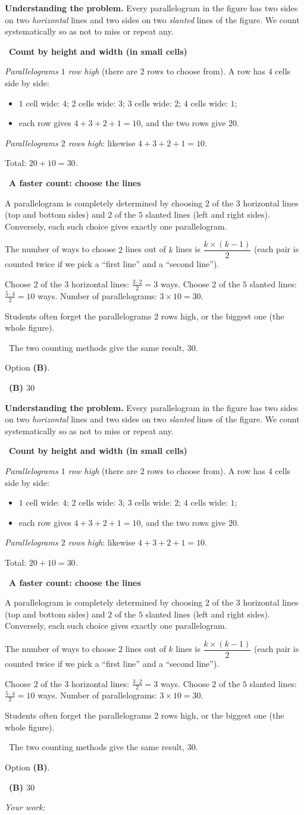 \documentclass[11pt]{article}
\newif\ifsol \soltrue
\providecommand{\AnsWord}{Đáp số}
\newcommand{\ans}[1]{\par\smallskip{\bfseries\color{tmGreen!88!black}\AnsWord:}\ {\bfseries\color{AnsRed}#1}\par}
\newcommand{\probsol}[1]{%
  \begin{lrbox}{\solmeasure}\begin{minipage}{\dimexpr\linewidth-24pt\relax}#1\end{minipage}\end{lrbox}%
  \ifsol
    \begin{solbox}#1\end{solbox}%
  \else
    \setlength{\solht}{\dimexpr\ht\solmeasure+\dp\solmeasure+0.85cm\relax}%
    \ifdim\solht<1.35cm\setlength{\solht}{1.35cm}\fi
    \ifdim\solht>\StudentMaxWork\setlength{\solht}{\StudentMaxWork}\fi
    \begin{tcolorbox}[colback=white,colframe=Line,boxrule=0.8pt,arc=5pt,
      left=8pt,right=8pt,top=4pt,bottom=4pt,height=\solht]{\footnotesize\color{Slate}\itshape\WorkWord}\end{tcolorbox}%
  \fi}
\newlength{\StudentMaxWork}\setlength{\StudentMaxWork}{7.5cm}
\newcommand{\step}[2]{\par\smallskip\noindent{\bfseries\color{tmBlue!85!black}\StepWord~#1.}\ {\bfseries #2}\par\nopagebreak}
\newcommand{\verify}[1]{\par\smallskip\noindent{\bfseries\color{tmGreen!80!black}\faCheckCircle\ \CheckWord}\ #1\par}
\def\WorkWord{Your work:}
\def\AnsWord{Answer}
\def\StepWord{Step}
\def\CheckWord{Check:}
\begin{document}
\probsol{
\textbf{Understanding the problem.} Every parallelogram in the figure has two sides on two \emph{horizontal}
lines and two sides on two \emph{slanted} lines of the figure. We count systematically so as not to miss or
repeat any.

\step{1}{Count by height and width (in small cells)}
\emph{Parallelograms $1$ row high} (there are $2$ rows to choose from). A row has $4$ cells side by side:
\begin{itemize}[leftmargin=1.4em,itemsep=1pt]
\item $1$ cell wide: $4$; $2$ cells wide: $3$; $3$ cells wide: $2$; $4$ cells wide: $1$;
\item each row gives $4+3+2+1=10$, and the two rows give $20$.
\end{itemize}
\emph{Parallelograms $2$ rows high}: likewise $4+3+2+1=10$.

Total: $20+10=30$.

\step{2}{A faster count: choose the lines}
\begin{proofbox}A parallelogram is completely determined by choosing $2$ of the $3$ horizontal lines (top and
bottom sides) and $2$ of the $5$ slanted lines (left and right sides). Conversely, each such choice gives exactly
one parallelogram.\end{proofbox}
\begin{recallbox}The number of ways to choose $2$ lines out of $k$ lines is $\dfrac{k\times(k-1)}{2}$ (each pair
is counted twice if we pick a ``first line'' and a ``second line'').\end{recallbox}
Choose $2$ of the $3$ horizontal lines: $\tfrac{3\cdot 2}{2}=3$ ways. Choose $2$ of the $5$ slanted lines:
$\tfrac{5\cdot4}{2}=10$ ways. Number of parallelograms: $3\times 10=30$.

\begin{warnbox}Students often forget the parallelograms $2$ rows high, or the biggest one (the whole
figure).\end{warnbox}
\verify{The two counting methods give the same result, $30$.}
Option \textbf{(B)}.
\ans{(B) $30$}
}
\end{document}
